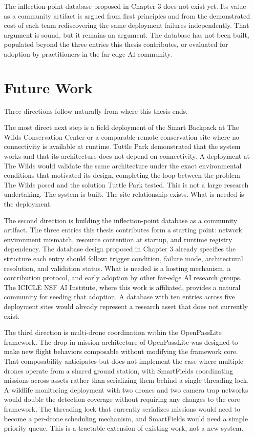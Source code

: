 The inflection-point database proposed in Chapter 3 does not exist yet. Its value as a community artifact is argued from first principles and from the demonstrated cost of each team rediscovering the same deployment failures independently. That argument is sound, but it remains an argument. The database has not been built, populated beyond the three entries this thesis contributes, or evaluated for adoption by practitioners in the far-edge AI community.

\section{Future Work}
\label{sec:concl_agnosticism}
Three directions follow naturally from where this thesis ends.

The most direct next step is a field deployment of the Smart Backpack at The Wilds Conservation Center or a comparable remote conservation site where no connectivity is available at runtime. Tuttle Park demonstrated that the system works and that its architecture does not depend on connectivity. A deployment at The Wilds would validate the same architecture under the exact environmental conditions that motivated its design, completing the loop between the problem The Wilds posed and the solution Tuttle Park tested. This is not a large research undertaking. The system is built. The site relationship exists. What is needed is the deployment.

The second direction is building the inflection-point database as a community artifact. The three entries this thesis contributes form a starting point: network environment mismatch, resource contention at startup, and runtime registry dependency. The database design proposed in Chapter 3 already specifies the structure each entry should follow: trigger condition, failure mode, architectural resolution, and validation status. What is needed is a hosting mechanism, a contribution protocol, and early adoption by other far-edge AI research groups. The ICICLE NSF AI Institute, where this work is affiliated, provides a natural community for seeding that adoption. A database with ten entries across five deployment sites would already represent a research asset that does not currently exist.

The third direction is multi-drone coordination within the OpenPassLite framework. The drop-in mission architecture of OpenPassLite was designed to make new flight behaviors composable without modifying the framework core. That composability anticipates but does not implement the case where multiple drones operate from a shared ground station, with SmartFields coordinating missions across assets rather than serializing them behind a single threading lock. A wildlife monitoring deployment with two drones and two camera trap networks would double the detection coverage without requiring any changes to the core framework. The threading lock that currently serializes missions would need to become a per-drone scheduling mechanism, and SmartFields would need a simple priority queue. This is a tractable extension of existing work, not a new system.

